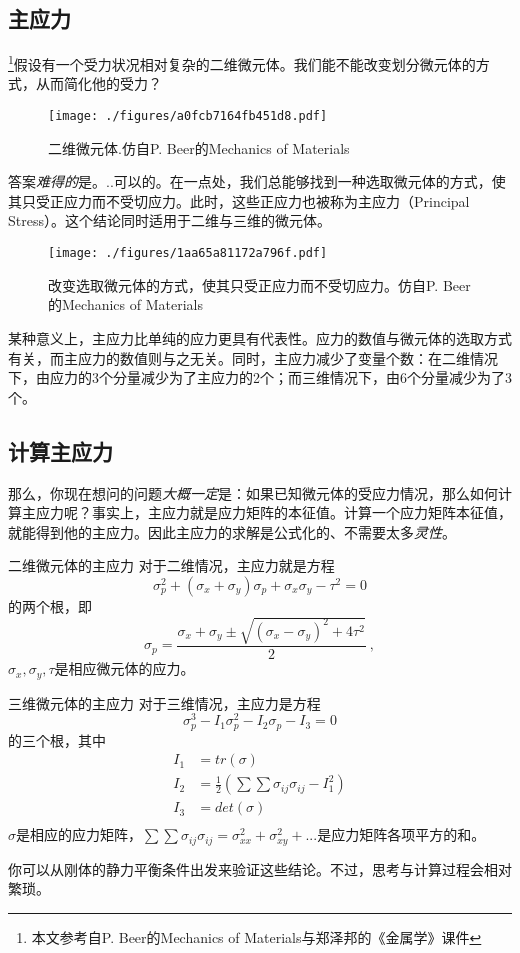 

\subsection{主应力}
\footnote{本文参考自P. Beer的Mechanics of Materials与郑泽邦的《金属学》课件}假设有一个受力状况相对复杂的二维微元体。我们能不能改变划分微元体的方式，从而简化他的受力？
\begin{figure}[ht]
\centering
\texttt{[image: ./figures/a0fcb7164fb451d8.pdf]}
\caption{二维微元体.仿自P. Beer的Mechanics of Materials} \label{fig_PRSTR_1}
\end{figure}

答案\textsl{难得的}是。..可以的。在一点处，我们总能够找到一种选取微元体的方式，使其只受正应力而不受切应力。此时，这些正应力也被称为主应力（Principal Stress）。这个结论同时适用于二维与三维的微元体。
\begin{figure}[ht]
\centering
\texttt{[image: ./figures/1aa65a81172a796f.pdf]}
\caption{改变选取微元体的方式，使其只受正应力而不受切应力。仿自P. Beer的Mechanics of Materials} \label{fig_PRSTR_2}
\end{figure}

某种意义上，主应力比单纯的应力更具有代表性。应力的数值与微元体的选取方式有关，而主应力的数值则与之无关。同时，主应力减少了变量个数：在二维情况下，由应力的3个分量减少为了主应力的2个；而三维情况下，由6个分量减少为了3个。

\subsection{计算主应力}

那么，你现在想问的问题\textsl{大概一定}是：如果已知微元体的受应力情况，那么如何计算主应力呢？事实上，主应力就是应力矩阵的本征值。计算一个应力矩阵本征值，就能得到他的主应力。因此主应力的求解是公式化的、不需要太多\textsl{灵性}。

\begin{example}{二维微元体的主应力}
对于二维情况，主应力就是方程
$$\sigma_p^2+(\sigma_x+\sigma_y)\sigma_p+\sigma_x\sigma_y-\tau^2=0$$
的两个根，即
$$\sigma_p=\frac{\sigma_x+\sigma_y \pm \sqrt{(\sigma_x-\sigma_y)^2+4\tau^2}}{2}~,$$
$\sigma_x,\sigma_y,\tau$是相应微元体的应力。
\end{example}

\begin{example}{三维微元体的主应力}
对于三维情况，主应力是方程 
$$
\sigma_p^3-I_1\sigma_p^2-I_2\sigma_p-I_3=0
$$
的三个根，其中
$$
\begin{aligned}
I_1&=tr(\sigma)\\
I_2&=\frac{1}{2} ({\sum \sum \sigma_{ij} \sigma_{ij} -I_1^2})\\
I_3&=det(\sigma)\\
\end{aligned}
$$
$\sigma$是相应的应力矩阵，$\sum \sum \sigma_{ij} \sigma_{ij}=\sigma_{xx}^2+\sigma_{xy}^2+...$是应力矩阵各项平方的和。
\end{example}
你可以从刚体的静力平衡条件出发来验证这些结论。不过，思考与计算过程会相对繁琐。
